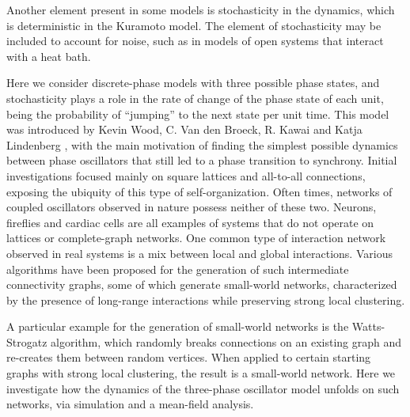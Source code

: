 Another element present in some models is stochasticity in the dynamics, which is deterministic in the Kuramoto model. The element of
stochasticity may be included to account for noise, such as in models of open systems that interact with a heat bath.

Here we consider discrete-phase models with three possible phase states, and stochasticity plays a role in the rate of change of the
phase state of each unit, being the probability of ``jumping'' to the next state per unit time. This model was introduced by Kevin
Wood, C.  Van den Broeck, R. Kawai and Katja Lindenberg \cite{Wood06a}, with the main motivation of finding the simplest possible
dynamics between phase oscillators that still led to a phase transition to synchrony. Initial investigations focused mainly on square
lattices and all-to-all connections, exposing the ubiquity of this type of self-organization. Often times, networks of coupled
oscillators observed in nature possess neither of these two. Neurons, fireflies and cardiac cells are all examples of systems that do
not operate on lattices or complete-graph networks. One common type of interaction network observed in real systems is a mix between
local and global interactions. Various algorithms have been proposed for the generation of such intermediate connectivity graphs, some
of which generate small-world networks, characterized by the presence of long-range interactions while preserving strong local
clustering.

A particular example for the generation of small-world networks is the Watts-Strogatz algorithm, which randomly breaks connections on
an existing graph and re-creates them between random vertices. When applied to certain starting graphs with strong local clustering,
the result is a small-world network. Here we investigate how the dynamics of the three-phase oscillator model unfolds on such networks,
via simulation and a mean-field analysis.
